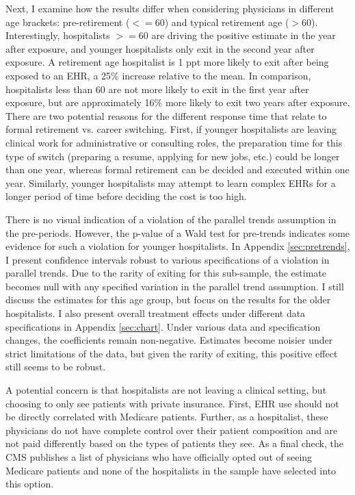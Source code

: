 \documentclass[12pt]{article}
\begin{document}
Next, I examine how the results differ when considering physicians in different age brackets: pre-retirement ($<= 60$) and typical retirement age ($> 60$). Interestingly, hospitalists $>=60$ are driving the positive estimate in the year after exposure, and younger hospitalists only exit in the second year after exposure. A retirement age hospitalist is 1 ppt more likely to exit after being exposed to an EHR, a 25\% increase relative to the mean. In comparison, hospitalists less than 60 are not more likely to exit in the first year after exposure, but are approximately 16\% more likely to exit two years after exposure. There are two potential reasons for the different response time that relate to formal retirement vs. career switching. First, if younger hospitalists are leaving clinical work for administrative or consulting roles, the preparation time for this type of switch (preparing a resume, applying for new jobs, etc.) could be longer than one year, whereas formal retirement can be decided and executed within one year. Similarly, younger hospitalists may attempt to learn complex EHRs for a longer period of time before deciding the cost is too high. 

There is no visual indication of a violation of the parallel trends assumption in the pre-periods. However, the p-value of a Wald test for pre-trends indicates some evidence for such a violation for younger hospitalists. In Appendix \ref{sec:pretrends}, I present confidence intervals robust to various specifications of a violation in parallel trends. Due to the rarity of exiting for this sub-sample, the estimate becomes null with any specified variation in the parallel trend assumption. I still discuss the estimates for this age group, but focus on the results for the older hospitalists. I also present overall treatment effects under different data specifications in Appendix \ref{sec:chart}. Under various data and specification changes, the coefficients remain non-negative. Estimates become noisier under strict limitations of the data, but given the rarity of exiting, this positive effect still seems to be robust. 

A potential concern is that hospitalists are not leaving a clinical setting, but choosing to only see patients with private insurance. First, EHR use should not be directly correlated with Medicare patients. Further, as a hospitalist, these physicians do not have complete control over their patient composition and are not paid differently based on the types of patients they see. As a final check, the CMS publishes a list of physicians who have officially opted out of seeing Medicare patients and none of the hospitalists in the sample have selected into this option. 
\end{document}
